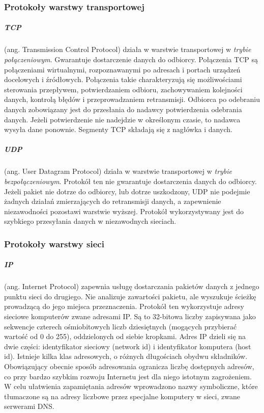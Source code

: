 \documentclass[a4paper,twoside]{report}
\begin{document}
\subsubsection{Protokoły warstwy transportowej}

\medskip 
\subparagraph{TCP} (ang. Transmission   Control   Protocol)   działa   w   warstwie transportowej   w   \emph{trybie połączeniowym}.  Gwarantuje dostarczenie danych do odbiorcy.  Połączenia  TCP  są  połączeniami  wirtualnymi,  rozpoznawanymi  po  adresach  i portach urządzeń  docelowych  i źródłowych.  Połączenia  takie  charakteryzują  się  możliwościami  sterowania przepływem,    potwierdzaniem    odbioru,    zachowywaniem    kolejności    danych,    kontrolą    błędów    i przeprowadzaniem  retransmisji. Odbiorca po odebraniu danych zobowiązany jest do przesłania do nadawcy potwierdzenia odebrania danych. Jeżeli potwierdzenie nie nadejdzie w określonym czasie, to nadawca wysyła dane ponownie.  Segmenty  TCP  składają  się  z  nagłówka  i  danych.

\subparagraph{UDP} (ang. User   Datagram   Protocol)   działa    w    warstwie    transportowej   w   \emph{trybie bezpołączeniowym}.  Protokół  ten  nie  gwarantuje  dostarczenia  danych  do  odbiorcy.  Jeżeli  pakiet  nie dotrze  do  odbiorcy,  lub  dotrze  uszkodzony,  UDP  nie podejmie żadnych  działań  zmierzających  do retransmisji  danych,  a  zapewnienie  niezawodności  pozostawi  warstwie  wyższej.   Protokół wykorzystywany jest do szybkiego przesyłania danych w niezawodnych sieciach. 




\subsubsection{Protokoły warstwy sieci}

\medskip 
\subparagraph{IP} (ang. Internet Protocol) zapewnia usługę dostarczania pakietów danych z jednego punktu sieci do drugiego. Nie analizuje zawartości pakietu, ale wyszukuje ścieżkę prowadzącą do jego miejsca przeznaczenia. Protokół ten wykorzystuje adresy sieciowe komputerów zwane adresami IP. Są to 32-bitowa liczby zapisywana jako sekwencje czterech ośmiobitowych liczb dziesiętnych (mogących przybierać wartość od 0 do 255), oddzielonych od siebie kropkami. Adres IP dzieli się na dwie części: identyfikator sieciowy (network id) i identyfikator komputera (host id). Istnieje kilka klas adresowych, o różnych długościach obydwu składników. Obowiązujący obecnie sposób adresowania ogranicza liczbę dostępnych adresów, co przy bardzo szybkim rozwoju Internetu jest dla niego istotnym zagrożeniem. W celu ułatwienia zapamiętania adresów wprowadzono nazwy symboliczne, które tłumaczone są na adresy liczbowe przez specjalne komputery w sieci, zwane serwerami DNS.
\end{document}
